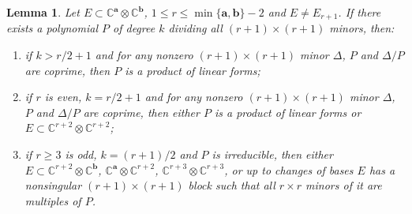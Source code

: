 \documentclass[10pt]{article} %
\newcommand{\aaa}{\mathbf{a}}
\newcommand{\bbb}{\mathbf{b}}
\newtheorem{lem}[thm]{Lemma}
\theoremstyle{definition}
\begin{document}
\begin{lem}\label{codim1lem2}
Let $E\subset\mathbb{C}^{\aaa}\otimes\mathbb{C}^{\bbb}$, $1\leq r\leq\min\{\aaa,\bbb\}-2$ and $E\neq E_{r+1}$. If there exists a polynomial $P$ of degree $k$ dividing all $(r+1)\times(r+1)$ minors, then:
\begin{enumerate}[(1)]
    \item if $k>r/2+1$ and for any nonzero $(r+1)\times(r+1)$ minor $\Delta$, $P$ and $\Delta/P$ are coprime, then $P$ is a product of linear forms;
    
    \item if $r$ is even, $k=r/2+1$ and for any nonzero $(r+1)\times(r+1)$ minor $\Delta$, $P$ and $\Delta/P$ are coprime, then either $P$ is a product of linear forms or $E\subset \mathbb{C}^{r+2}\otimes \mathbb{C}^{r+2}$;
    
    \item if $r\geq3$ is odd, $k=(r+1)/2$ and $P$ is irreducible, then either $E\subset \mathbb{C}^{r+2}\otimes \mathbb{C}^{\bbb}$, $\mathbb{C}^{\aaa}\otimes \mathbb{C}^{r+2}$, $\mathbb{C}^{r+3}\otimes \mathbb{C}^{r+3}$, or up to changes of bases $E$ has a nonsingular $(r+1)\times(r+1)$ block such that all $r\times r$ minors of it are multiples of $P$. 
\end{enumerate}
\end{lem} 
\end{document}
